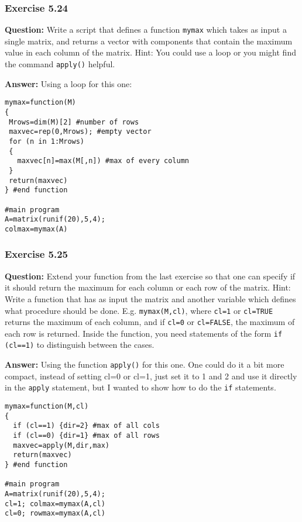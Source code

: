 \documentclass [11pt]{article}
\newcommand{\code}[1]{{\tt #1}}
\begin{document}
\newpage
\subsubsection*{Exercise 5.24}
\textbf{Question:} Write a script that defines a function \texttt{mymax} which takes as input a single
matrix, and returns a vector with components that contain the maximum value in each column of the matrix. Hint: You could use a loop or you might find the command \code{apply()} helpful.


\textbf{Answer:} Using a loop for this one:
\begin{verbatim}
mymax=function(M)
{
 Mrows=dim(M)[2] #number of rows
 maxvec=rep(0,Mrows); #empty vector
 for (n in 1:Mrows)
 {
   maxvec[n]=max(M[,n]) #max of every column
 }
 return(maxvec)
} #end function

#main program
A=matrix(runif(20),5,4);
colmax=mymax(A)
\end{verbatim}

\subsubsection*{Exercise 5.25}
\textbf{Question:} Extend your function from the last exercise so that one can specify if it should return the maximum for each column or each row of the matrix. Hint: Write a function that has as input the matrix and another variable which defines what procedure should be done. E.g. 
\code{mymax(M,cl)}, where \code{cl=1} or \code{cl=TRUE} returns the maximum of each column, and if \code{cl=0} or \code{cl=FALSE}, the maximum of each row is returned. Inside the function, you need statements of the form \code{if (cl==1)} to distinguish between the cases.


\textbf{Answer:} Using the function \code{apply()} for this one. One could do it a bit more compact, instead of setting cl=0 or cl=1, just set it to 1 and 2 and use it directly in the \code{apply} statement, but I wanted to show how to do the \code{if} statements. 
\begin{verbatim}
mymax=function(M,cl)
{
  if (cl==1) {dir=2} #max of all cols 
  if (cl==0) {dir=1} #max of all rows
  maxvec=apply(M,dir,max) 
  return(maxvec)
} #end function

#main program
A=matrix(runif(20),5,4);
cl=1; colmax=mymax(A,cl)
cl=0; rowmax=mymax(A,cl)
\end{verbatim}
\end{document}
